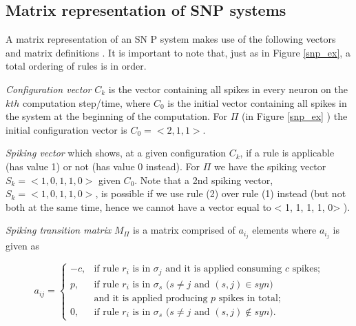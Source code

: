 \documentclass{acm_proc_article-sp}
\begin{document}




\subsection{Matrix representation of SNP systems}
A matrix representation of an SN P system makes use of the
following vectors and matrix definitions \cite{snpbrain}\cite{snpmat} . It is important to note that, just as in Figure \ref{snp_ex}, a total ordering of rules is in
order.

\textit{Configuration vector} $C_k$ is the vector containing all spikes in every neuron on the $kth$ computation step/time, where $C_0$ is the initial vector containing all spikes in the system at the beginning of the computation. For $\Pi$ (in Figure \ref{snp_ex} ) the initial configuration vector is $C_0 = < 2, 1, 1 >$.

\textit{Spiking vector} which shows, at a given configuration $C_k$, if a
rule is applicable (has value 1) or not (has value 0 instead). For $\Pi$ we have the
spiking vector $S_k = < 1, 0, 1, 1, 0 >$ given $C_0$.
Note that a 2nd spiking vector, $S_k = < 1, 0, 1, 1, 0 >$, is
possible if we use rule (2) over rule (1) instead (but not both
at the same time, hence we cannot have a vector equal to
< 1, 1, 1, 1, 0> ).

\textit{Spiking transition matrix} $M_{\Pi}$ is a matrix comprised of $a_i_j$
elements where $a_i_j$ is given as

\begin{definition}\label{defi-snp-mat}
$$
a_{ij} = \left\{
\begin{array}{rl}
-c, &\mbox{if rule $r_i$ is in $\sigma_j$ and it is applied consuming $c$ spikes;} \\
 p, &\mbox{if rule $r_i$ is in $\sigma_s$ ($s\neq j$ and $(s,j)\in syn$)} \\
 & \mbox{and it is applied producing $p$ spikes in total;}\\
 0, &\mbox{if rule $r_i$ is in $\sigma_s$ ($s\neq j$ and $(s,j)\notin syn$).}
    \end{array}
\right.
$$
\end{definition}
\end{document}
